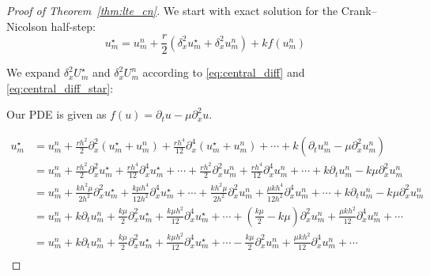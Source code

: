 \begin{proof}[Proof of Theorem~\ref{thm:lte_cn}]
  We start with exact solution for the Crank--Nicolson half-step:
  \[
    u_m^\star = u_m^n
    + \frac{r}{2}\left(\delta_x^2 u_m^\star + \delta_x^2 u_m^n\right)
    + k f(u_m^n)
  \]

  We expand \(\delta_x^2 U_m^\star\) and \(\delta_x^2 U_m^n\) according to \eqref{eq:central_diff} and \eqref{eq:central_diff_star}:

  Our PDE is given as \(f(u) = \partial_t u - \mu \partial_x^2 u \).

  \begin{align*}
    u_m^\star & = u_m^n
    + \tfrac{r h^2}{2}\partial_x^2 \left(u_m^\star + u_m^n\right)
    + \tfrac{rh^4}{12}\partial_x^4 \left(u_m^\star + u_m^n\right)
    + \cdots + k\left(\partial_t u_m^n - \mu \partial_x^2 u_m^n\right)                                                                                                                                                                                  \\
              & = u_m^n
    + \tfrac{r h^2}{2}\partial_x^2 u_m^\star + \tfrac{rh^4}{12}\partial_x^4 u_m^\star + \cdots
    + \tfrac{r h^2}{2}\partial_x^2 u_m^n + \tfrac{rh^4}{12}\partial_x^4 u_m^n + \cdots
    + k\partial_t u_m^n - k\mu \partial_x^2 u_m^n                                                                                                                                                                                                       \\
              & = u_m^n
    + \tfrac{k h^2 \mu}{2h^2}\partial_x^2 u_m^\star + \tfrac{k \mu h^4}{12h^2}\partial_x^4 u_m^\star + \cdots
    + \tfrac{k h^2 \mu }{2h^2}\partial_x^2 u_m^n + \tfrac{\mu k h^4}{12h^2}\partial_x^4 u_m^n + \cdots
    + k\partial_t u_m^n - k\mu \partial_x^2 u_m^n                                                                                                                                                                                                       \\
              & = u_m^n + k\partial_t u_m^n + \tfrac{k \mu}{2}\partial_x^2 u_m^\star + \tfrac{k \mu h^2}{12}\partial_x^4 u_m^\star + \cdots + \left(\tfrac{k\mu}{2} - k \mu\right)\partial_x^2 u_m^n + \tfrac{\mu k h^2}{12}\partial_x^4 u_m^n + \cdots \\
              & = u_m^n + k\partial_t u_m^n + \tfrac{k \mu}{2}\partial_x^2 u_m^\star + \tfrac{k \mu h^2}{12}\partial_x^4 u_m^\star + \cdots - \tfrac{k\mu}{2}\partial_x^2 u_m^n + \tfrac{\mu k h^2}{12}\partial_x^4 u_m^n + \cdots                      \\
      \end{align*}


\end{proof}
